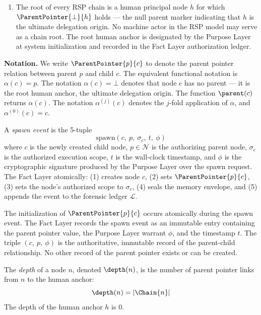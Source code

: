 \begin{dfn}
\begin{enumerate}
    \item[(P4) \textbf{Human Anchor Termination}] The root of every RSP chain is a human principal node $h$ for which $\ParentPointer{\bot}{h}$ holds — the null parent marker indicating that $h$ is the ultimate delegation origin. No machine actor in the RSP model may serve as a chain root. The root human anchor is designated by the Purpose Layer at system initialization and recorded in the Fact Layer authorization ledger.
\end{enumerate}
\end{dfn}

\medskip
\noindent\textbf{Notation.} We write $\ParentPointer{p}{c}$ to denote the parent pointer relation between parent $p$ and child $c$. The equivalent functional notation is $\alpha(c) = p$. The notation $\alpha(c) = \bot$ denotes that node $c$ has no parent — it is the root human anchor, the ultimate delegation origin. The function $\parent(c)$ returns $\alpha(c)$. The notation $\alpha^{(j)}(c)$ denotes the $j$-fold application of $\alpha$, and $\alpha^{(0)}(c) = c$.

\begin{dfn}
\label{dfn:spawn-event}
A \emph{spawn event} is the 5-tuple
\begin{equation}
\mathrm{spawn}(c,\ p,\ \sigma_c,\ t,\ \phi)
\label{eq:spawn-tuple}
\end{equation}
where $c$ is the newly created child node, $p \in \mathcal{N}$ is the authorizing parent node, $\sigma_c$ is the authorized execution scope, $t$ is the wall-clock timestamp, and $\phi$ is the cryptographic signature produced by the Purpose Layer over the spawn request. The Fact Layer atomically: (1) creates node $c$, (2) sets $\ParentPointer{p}{c}$, (3) sets the node's authorized scope to $\sigma_c$, (4) seals the memory envelope, and (5) appends the event to the forensic ledger $\mathcal{L}$.
\end{dfn}

The initialization of $\ParentPointer{p}{c}$ occurs atomically during the spawn event. The Fact Layer records the spawn event as an immutable entry containing the parent pointer value, the Purpose Layer warrant $\phi$, and the timestamp $t$. The triple $(c,\ p,\ \phi)$ is the authoritative, immutable record of the parent-child relationship. No other record of the parent pointer exists or can be created.

\begin{dfn}
\label{dfn:node-depth}
The \emph{depth} of a node $n$, denoted $\depth(n)$, is the number of parent pointer links from $n$ to the human anchor:
\begin{equation}
\depth(n) = |\Chain{n}|
\label{eq:depth-def}
\end{equation}
The depth of the human anchor $h$ is $0$.
\end{dfn}

